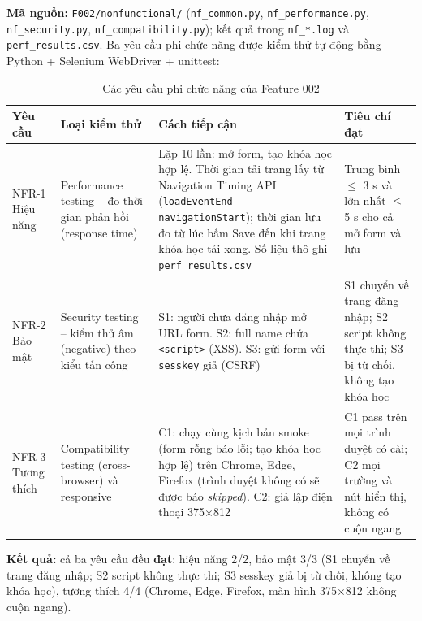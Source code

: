 \textbf{Mã nguồn:} \texttt{F002/nonfunctional/} (\texttt{nf\_common.py}, \texttt{nf\_performance.py}, \texttt{nf\_security.py},
\texttt{nf\_compatibility.py}); kết quả trong \texttt{nf\_*.log} và \texttt{perf\_results.csv}. Ba yêu cầu phi chức năng được kiểm thử
tự động bằng Python + Selenium WebDriver + unittest:


\begin{table}[H]
\centering\footnotesize
\begin{tabular}{|L{2.4cm}|L{3.6cm}|L{4.6cm}|L{3.6cm}|}
\hline
{}\textbf{Yêu cầu} & \textbf{Loại kiểm thử} & \textbf{Cách tiếp cận} & \textbf{Tiêu chí đạt} \\ \hline
NFR-1 Hiệu năng  & Performance testing -- đo thời gian phản hồi (response time) &
  Lặp 10 lần: mở form, tạo khóa học hợp lệ. Thời gian tải trang lấy từ Navigation Timing API (\texttt{loadEventEnd - navigationStart});
  thời gian lưu đo từ lúc bấm Save đến khi trang khóa học tải xong. Số liệu thô ghi \texttt{perf\_results.csv} &
  Trung bình $\leq$ 3 s và lớn nhất $\leq$ 5 s cho cả mở form và lưu \\ \hline
NFR-2 Bảo mật  & Security testing -- kiểm thử âm (negative) theo kiểu tấn công &
  S1: người chưa đăng nhập mở URL form. S2: full name chứa \texttt{<script>} (XSS). S3: gửi form với \texttt{sesskey} giả (CSRF) &
  S1 chuyển về trang đăng nhập; S2 script không thực thi; S3 bị từ chối, không tạo khóa học \\ \hline
NFR-3 Tương thích  & Compatibility testing (cross-browser) và responsive &
  C1: chạy cùng kịch bản smoke (form rỗng báo lỗi; tạo khóa học hợp lệ) trên Chrome, Edge, Firefox (trình duyệt không có sẽ được báo \textit{skipped}).
  C2: giả lập điện thoại 375$\times$812 &
  C1 pass trên mọi trình duyệt có cài; C2 mọi trường và nút hiển thị, không có cuộn ngang \\ \hline
\end{tabular}
\caption{Các yêu cầu phi chức năng của Feature 002}
\end{table}

\textbf{Kết quả:} cả ba yêu cầu đều \textbf{đạt}: hiệu năng 2/2, bảo mật 3/3 (S1 chuyển về trang đăng nhập; S2 script không thực thi;
S3 sesskey giả bị từ chối, không tạo khóa học), tương thích 4/4 (Chrome, Edge, Firefox, màn hình 375$\times$812 không cuộn ngang).


